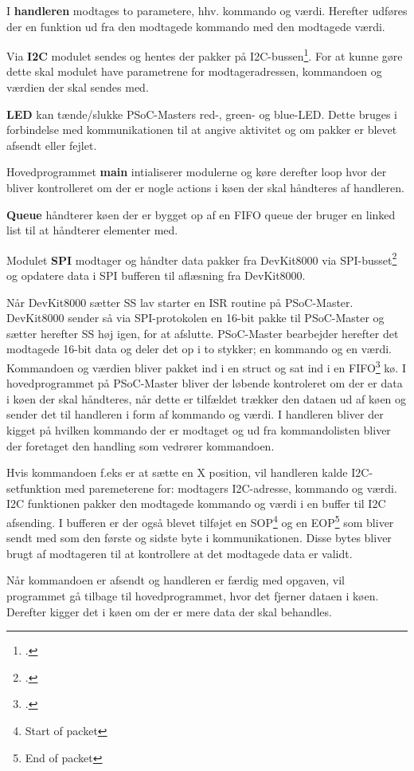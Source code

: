 I \textbf{handleren} modtages to parametere, hhv. kommando og værdi.
Herefter udføres der en funktion ud fra den modtagede kommando med den modtagede værdi.

Via \textbf{I2C} modulet sendes og hentes der pakker på I2C-bussen\footcite{scb}.
For at kunne gøre dette skal modulet have parametrene for modtageradressen, kommandoen og værdien der skal sendes med.

\textbf{LED} kan tænde/slukke PSoC-Masters red-, green- og blue-LED. Dette bruges i forbindelse med kommunikationen til at angive aktivitet og om pakker er blevet afsendt eller fejlet.

Hovedprogrammet \textbf{main} intialiserer modulerne og køre derefter loop hvor der bliver kontrolleret om der er nogle actions i køen der skal håndteres af handleren.

\textbf{Queue} håndterer køen der er bygget op af en FIFO queue der bruger en linked list til at håndterer elementer med.

Modulet \textbf{SPI} modtager og håndter data pakker fra DevKit8000 via SPI-busset\footcite{scb} og opdatere data i SPI bufferen til aflæsning fra DevKit8000.

Når DevKit8000 sætter SS lav starter en ISR routine på PSoC-Master. DevKit8000 sender så via SPI-protokolen en 16-bit pakke til PSoC-Master og sætter herefter SS høj igen, for at afslutte.
PSoC-Master bearbejder herefter det modtagede 16-bit data og deler det op i to stykker; en kommando og en værdi.
Kommandoen og værdien bliver pakket ind i en struct og sat ind i en FIFO\footcite{fifo} kø.
I hovedprogrammet på PSoC-Master bliver der løbende kontroleret om der er data i køen der skal håndteres, når dette er tilfældet trækker den dataen ud af køen og sender det til handleren i form af kommando og værdi. I handleren bliver der kigget på hvilken kommando der er modtaget og ud fra kommandolisten bliver der foretaget den handling som vedrører kommandoen. 

Hvis kommandoen f.eks er at sætte en X position, vil handleren kalde I2C-setfunktion med paremeterene for: modtagers I2C-adresse, kommando og værdi. I2C funktionen pakker den modtagede kommando og værdi i en buffer til I2C afsending. I bufferen er der også blevet tilføjet en SOP\footnote{Start of packet} og en EOP\footnote{End of packet} som bliver sendt med som den første og sidste byte i kommunikationen. Disse bytes bliver brugt af modtageren til at kontrollere at det modtagede data er validt.

Når kommandoen er afsendt og handleren er færdig med opgaven, vil programmet gå tilbage til hovedprogrammet, hvor det fjerner dataen i køen. Derefter kigger det i køen om der er mere data der skal behandles.


